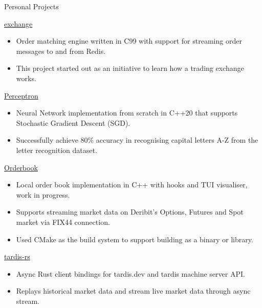 \documentclass{article}
\newlength{\tabin}
\newlength{\secsep}
\newcommand{\lineunder}{\vspace*{-8pt} \\ \hspace*{-6pt} \hrulefill \\ \vspace*{-15pt}}
\newenvironment{tabbedsection}[1]{
  \begin{list}{}{
      \setlength{\itemsep}{0pt}
      \setlength{\labelsep}{0pt}
      \setlength{\labelwidth}{0pt}
      \setlength{\leftmargin}{\tabin}
      \setlength{\rightmargin}{\tabin}
      \setlength{\listparindent}{0pt}
      \setlength{\parsep}{0pt}
      \setlength{\parskip}{0pt}
      \setlength{\partopsep}{0pt}
      \setlength{\topsep}{#1}
    }
  \item[]
}{\end{list}}
\newenvironment{resume_section}[1]{
  \filbreak
  \vspace{2\secsep}
  \textsc{\large#1}
  \lineunder
  \begin{tabbedsection}{\secsep}
}{\end{tabbedsection}}
\newenvironment{resume_subsection}[2][]{
  \textbf{#2} \hfill {\footnotesize #1} \hspace{2em}
  \begin{tabbedsection}{0.5\secsep}
}{\end{tabbedsection}}
\newenvironment{subitems}{
  \renewcommand{\labelitemi}{-}
  \begin{itemize}
      \setlength{\labelsep}{1em}
}{\end{itemize}}
\begin{document}
\begin{resume_section}{Personal Projects}
  \begin{resume_subsection}[(December 2023)]{\href{https://github.com/marcustut/exchange}{exchange}}
    \begin{subitems}
      \item Order matching engine written in C99 with support for streaming order messages to and from Redis.
      \item This project started out as an initiative to learn how a trading exchange works.
    \end{subitems}
  \end{resume_subsection}

  \begin{resume_subsection}[(November 2023)]{\href{https://github.com/marcustut/perceptron}{Perceptron}}
    \begin{subitems}
      \item Neural Network implementation from scratch in C++20 that supports Stochastic Gradient Descent (SGD).
      \item Successfully achieve 80\% accuracy in recognising capital letters A-Z from the letter recognition dataset.
    \end{subitems}
  \end{resume_subsection}

  \begin{resume_subsection}[(October 2023)]{\href{https://github.com/marcustut/orderbook}{Orderbook}}
    \begin{subitems}
      \item Local order book implementation in C++ with hooks and TUI visualiser, work in progress.
      \item Supports streaming market data on Deribit's Options, Futures and Spot market via FIX44 connection.
      \item Used CMake as the build system to support building as a binary or library.
    \end{subitems}
  \end{resume_subsection}

  \begin{resume_subsection}[(September 2023)]{\href{https://github.com/cybotrade/tardis-rs}{tardis-rs}}
    \begin{subitems}
      \item Async Rust client bindings for tardis.dev and tardis machine server API.
      \item Replays historical market data and stream live market data through async stream.
    \end{subitems}
  \end{resume_subsection}


\end{resume_section}
\end{document}
